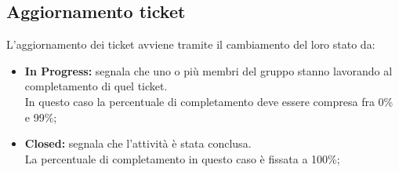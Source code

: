   \subsection{Aggiornamento ticket}
    L'aggiornamento dei ticket avviene tramite il cambiamento del loro stato da:
    \begin{itemize}
      \item \textbf{In Progress: }segnala che uno o più membri del gruppo stanno lavorando al completamento di quel ticket.\\
      In questo caso la percentuale di completamento deve essere compresa fra 0\% e 99\%;
      \item \textbf{Closed: }segnala che l'attività è stata conclusa.\\
      La percentuale di completamento in questo caso è fissata a 100\%;
    \end{itemize}

